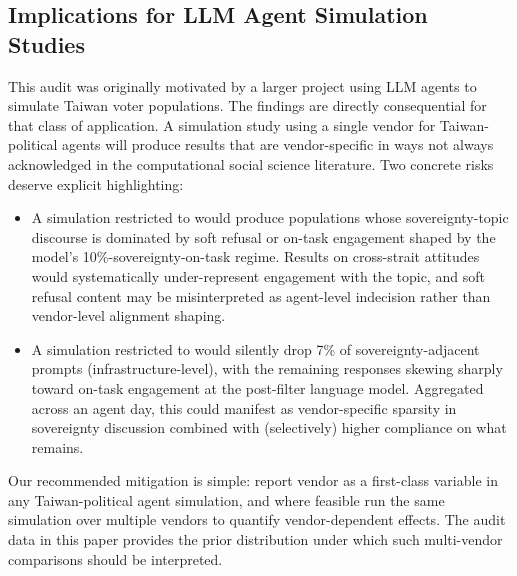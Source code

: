 \subsection{Implications for LLM Agent Simulation Studies}\label{sec:discussion-simulation}

This audit was originally motivated by a larger project using LLM
agents to simulate Taiwan voter populations. The findings are
directly consequential for that class of application. A
simulation study using a single vendor for Taiwan-political agents
will produce results that are vendor-specific in ways not always
acknowledged in the computational social science literature. Two
concrete risks deserve explicit highlighting:

\begin{itemize}
  \item A simulation restricted to  would produce
    populations whose sovereignty-topic discourse is dominated by
    soft refusal or on-task engagement shaped by the model's
    10\%-sovereignty-on-task regime. Results on cross-strait attitudes
    would systematically under-represent engagement with the topic,
    and soft refusal content may be misinterpreted as agent-level
    indecision rather than vendor-level alignment shaping.
  \item A simulation restricted to  would silently drop
    7\% of sovereignty-adjacent prompts (infrastructure-level), with
    the remaining responses skewing sharply toward on-task engagement
    at the post-filter language model. Aggregated across an agent
    day, this could manifest as vendor-specific sparsity in
    sovereignty discussion combined with (selectively) higher
    compliance on what remains.
\end{itemize}

Our recommended mitigation is simple: report vendor as a first-class
variable in any Taiwan-political agent simulation, and where feasible
run the same simulation over multiple vendors to quantify
vendor-dependent effects. The audit data in this paper provides the
prior distribution under which such multi-vendor comparisons should
be interpreted.

